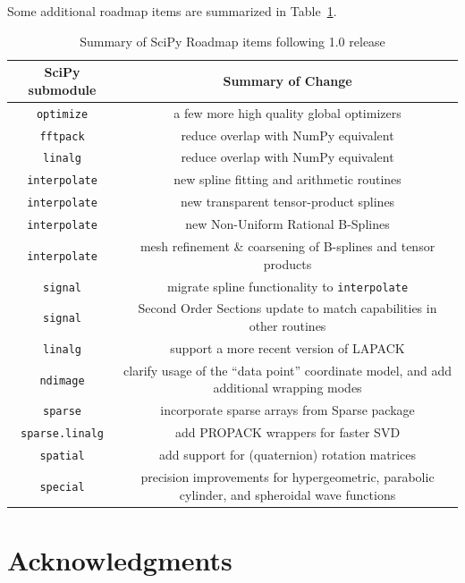\documentclass[fleqn,10pt]{wlscirep}
\begin{document}
Some additional roadmap items are summarized in Table~\ref{table:roadmap}.

\begin{table}[H]
\caption{Summary of SciPy Roadmap items following 1.0 release}
\begin{tabular}{ c|c }
    SciPy submodule & Summary of Change \\
    \hline
    \texttt{optimize} & a few more high quality global optimizers\\
    \texttt{fftpack} & reduce overlap with NumPy equivalent \\
    \texttt{linalg} & reduce overlap with NumPy equivalent \\
    \texttt{interpolate} & new spline fitting and arithmetic routines \\
    \texttt{interpolate} & new transparent tensor-product splines\\
    \texttt{interpolate} & new Non-Uniform Rational B-Splines\\
    \texttt{interpolate} & mesh refinement \& coarsening of B-splines and tensor products\\
    \texttt{signal} & migrate spline functionality to \texttt{interpolate}\\
    \texttt{signal} & Second Order Sections update to match capabilities in other routines\\
    \texttt{linalg} & support a more recent version of LAPACK\\
    \texttt{ndimage} & clarify usage of the ``data point'' coordinate
    model, and add additional wrapping modes\\
    \texttt{sparse} & incorporate sparse arrays from Sparse package\cite{abbasi2018sparse} \\
    \texttt{sparse.linalg} & add PROPACK wrappers for faster SVD\\
    \texttt{spatial} & add support for (quaternion) rotation matrices\\
    \texttt{special} & precision improvements for hypergeometric, parabolic cylinder, and spheroidal wave functions\\
\end{tabular}\label{table:roadmap}
\end{table}



\section*{Acknowledgments}
\end{document}
